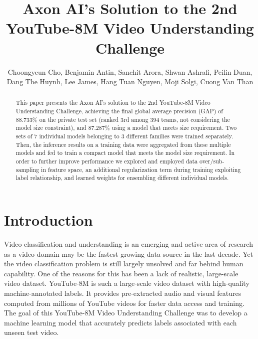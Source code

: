 \documentclass[runningheads]{llncs}
\begin{document}
\pagestyle{headings}
\mainmatter
\def\ECCV18SubNumber{***}  %
\title{Axon AI's Solution to the 2nd YouTube-8M Video Understanding Challenge}
\titlerunning{ECCV-18 submission ID \ECCV18SubNumber}
\authorrunning{ECCV-18 submission ID \ECCV18SubNumber}
\author{Choongyeun Cho, Benjamin Antin, Sanchit Arora, Shwan Ashrafi, Peilin Duan, Dang The Huynh, Lee James, Hang Tuan Nguyen, Moji Solgi, Cuong Van Than}
\maketitle

\begin{abstract}
This paper presents the Axon AI's solution to the 2nd YouTube-8M Video Understanding Challenge, achieving the final global average precision (GAP) of 88.733\% on the private test set (ranked 3rd among 394 teams, not considering the model size constraint), and 87.287\% using a model that meets size requirement.
Two sets of 7 individual models belonging to 3 different families were trained separately.
Then, the inference results on a training data were aggregated from these multiple models and fed to train a compact model that meets the model size requirement.
In order to further improve performance we explored and employed data over/sub-sampling in feature space, an additional regularization term during training exploiting label relationship, and learned weights for ensembling different individual models.
\end{abstract}

\section{Introduction}
Video classification and understanding is an emerging and active area of research as a video domain may be the fastest growing data source in the last decade.
Yet the video classification problem is still largely unsolved and far behind human capability.
One of the reasons for this has been a lack of realistic, large-scale video dataset.
YouTube-8M is such a large-scale video dataset with high-quality machine-annotated labels.
It provides pre-extracted audio and visual features computed from millions of YouTube videos for faster data access and training.
The goal of this YouTube-8M Video Understanding Challenge was to develop a machine learning model that accurately predicts labels associated with each unseen test video.
\end{document}
